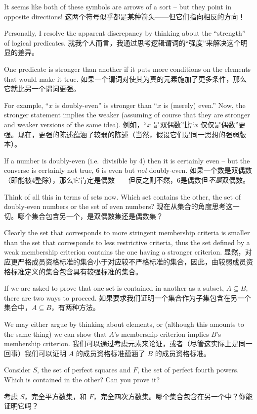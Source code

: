 It seems like both
of these symbols are arrows of a sort -- but they point in opposite
directions!
这两个符号似乎都是某种箭头——但它们指向相反的方向！

Personally, I resolve the apparent discrepancy by thinking
about the ``strength'' of logical predicates.
就我个人而言，我通过思考逻辑谓词的“强度”来解决这个明显的差异。

One predicate is stronger
than another if it puts more conditions on the elements that would make
it true.
如果一个谓词对使其为真的元素施加了更多条件，那么它就比另一个谓词更强。

For example, ``$x$ is doubly-even'' is stronger than 
``$x$ is (merely) even.''   Now, the stronger statement implies the weaker
(assuming of course that they are stronger and weaker versions of the 
same idea).
例如，“$x$ 是双偶数”比“$x$ 仅仅是偶数”更强。现在，更强的陈述蕴涵了较弱的陈述（当然，假设它们是同一思想的强弱版本）。

If a number is doubly-even (i.e.\ divisible by 4) then it
is certainly even -- but the converse is certainly not true, $6$ is even
but \emph{not} doubly-even.
如果一个数是双偶数（即能被4整除），那么它肯定是偶数——但反之则不然，6是偶数但\emph{不是}双偶数。

Think of all this in terms of sets now.
Which set contains the other, the set of doubly-even numbers or the set
of even numbers?
现在从集合的角度思考这一切。哪个集合包含另一个，是双偶数集还是偶数集？

Clearly the set that corresponds to more stringent
membership criteria is smaller than the set that corresponds
to less restrictive criteria, thus the set defined by a weak membership
criterion contains the one having a stronger criterion.
显然，对应更严格成员资格标准的集合小于对应较不严格标准的集合，因此，由较弱成员资格标准定义的集合包含具有较强标准的集合。

If we are asked to prove that one set is contained in another as a subset,
$A \subseteq B$, there are two ways to proceed.
如果要求我们证明一个集合作为子集包含在另一个集合中，$A \subseteq B$，有两种方法。

We may either argue by
thinking about elements, or (although this amounts to the same thing) 
we can show that $A$'s membership criterion
implies $B$'s membership criterion.
我们可以通过考虑元素来论证，或者（尽管这实际上是同一回事）我们可以证明 $A$ 的成员资格标准蕴涵了 $B$ 的成员资格标准。
\begin{exer}
Consider $S$, the set of perfect squares and $F$, the set of perfect fourth
powers.  Which is contained in the other?
Can you prove it?

考虑 $S$，完全平方数集，和 $F$，完全四次方数集。哪个集合包含在另一个中？你能证明它吗？
\end{exer}

